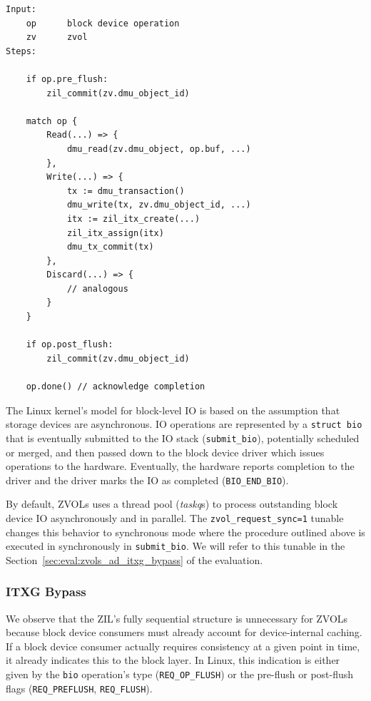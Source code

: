 \documentclass[12pt,a4paper,twoside]{book}
\begin{document}
\begin{lstlisting}[style=figurepseudocode]
Input:
    op      block device operation
    zv      zvol
Steps:

    if op.pre_flush:
        zil_commit(zv.dmu_object_id)

    match op {
        Read(...) => {
            dmu_read(zv.dmu_object, op.buf, ...)
        },
        Write(...) => {
            tx := dmu_transaction()
            dmu_write(tx, zv.dmu_object_id, ...)
            itx := zil_itx_create(...)
            zil_itx_assign(itx)
            dmu_tx_commit(tx)
        },
        Discard(...) => {
            // analogous
        }
    }

    if op.post_flush:
        zil_commit(zv.dmu_object_id)

    op.done() // acknowledge completion

\end{lstlisting}

The Linux kernel's model for block-level IO is based on the assumption that storage devices are asynchronous.
IO operations are represented by a \lstinline[style=figurepseudocode]{struct bio} that is eventually submitted to the IO stack (\lstinline{submit_bio}), potentially scheduled or merged, and then passed down to the block device driver which issues operations to the hardware.
Eventually, the hardware reports completion to the driver and the driver marks the IO as completed (\lstinline{BIO_END_BIO}).

By default, ZVOLs uses a thread pool (\textit{taskq}s) to process outstanding block device IO asynchronously and in parallel.
The \lstinline{zvol_request_sync=1} tunable changes this behavior to synchronous mode where the procedure outlined above is executed in synchronously in \lstinline{submit_bio}.
We will refer to this tunable in the Section~\ref{sec:eval:zvols_ad_itxg_bypass} of the evaluation.

\subsubsection{ITXG Bypass}

We observe that the ZIL's fully sequential structure is unnecessary for ZVOLs because block device consumers must already account for device-internal caching.
If a block device consumer actually requires consistency at a given point in time, it already \underline{} indicates this to the block layer.
In Linux, this indication is either given by the \lstinline{bio} operation's type (\lstinline{REQ_OP_FLUSH}) or the pre-flush or post-flush flags (\lstinline{REQ_PREFLUSH}, \lstinline{REQ_FLUSH}).
\end{document}
